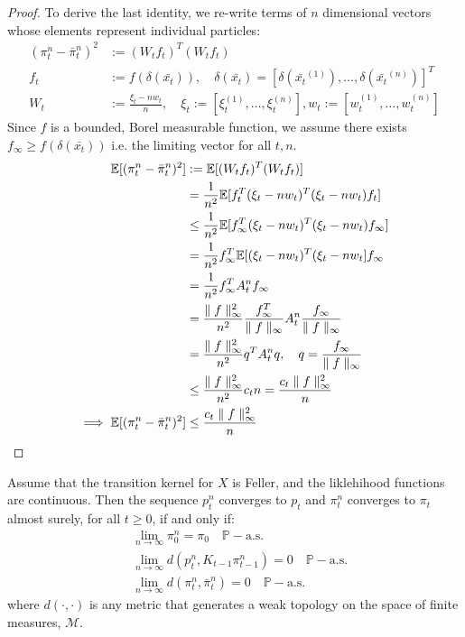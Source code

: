 \begin{lemma}
\begin{proof}
		To derive the last identity, we re-write terms of $n$ dimensional vectors whose elements represent individual particles:
		\begin{align}
		(\pi_t^n - \bar{\pi}_t^n)^2 &:= (W_t f_t)^T (W_t f_t) \\
		f_t& := f(\delta(\bar{x_t})), \quad \delta(\bar{x_t}) = [\delta(\bar{x_t}^{(1)}), \hdots, \delta(\bar{x_t}^{(n)})]^T \\		
		W_t& := \frac{\xi_t - nw_t}{n},  \quad \xi_t := [ \xi_t^{(1)}, \hdots, \xi_t^{(n)}], w_t := [w_t^{(1)}, \hdots, w_t^{(n)}]
		\end{align} Since $f$ is a bounded, Borel measurable function, we assume there exists $ f_\infty \geq f(\delta(\bar{x_t})) $ i.e. the limiting vector for all $t, n$. 
		\begin{align}
		\mathbb{E}[(\pi_t^n - \bar{\pi}_t^n)^2] &:= \mathbb{E}[(W_t f_t)^T (W_t f_t)] \\
		& = \frac{1}{n^2}\mathbb{E}[f_t^T (\xi_t - nw_t)^T(\xi_t - nw_t) f_t ] \\
		& \leq \frac{1}{n^2}\mathbb{E}[f_\infty^T (\xi_t - nw_t)^T(\xi_t - nw_t) f_\infty ] \\
		& = \frac{1}{n^2} f_\infty^T \mathbb{E}[ (\xi_t - nw_t)^T(\xi_t - nw_t ] f_\infty\\
		& = \frac{1}{n^2} f_\infty^T A_t^n f_\infty \\
		& = \frac{\parallel f\parallel_\infty^2}{n^2} \frac{f_\infty^T}{\parallel f\parallel_\infty} A_t^n \frac{f_\infty}{\parallel f\parallel_\infty} \\
		& = \frac{\parallel f\parallel_\infty^2}{n^2} q^T A_t^n q, \quad q = \frac{f_\infty}{\parallel f\parallel_\infty} \\
		& \leq \frac{\parallel f\parallel_\infty^2}{n^2} c_t n	
		= \frac{c_t \parallel f\parallel_\infty^2}{n} \\
		\implies \mathbb{E}[(\pi_t^n - \bar{\pi}_t^n)^2]  & \leq \frac{c_t \parallel f\parallel_\infty^2}{n}
		\end{align}
	\end{proof}
\end{lemma}

\begin{lemma} 
	Assume that the transition kernel for $X$ is Feller, and the liklehihood functions are continuous. Then the sequence $p^n_t$ converges to $p_t$ and $\pi^n_t$ converges to $\pi_t$ almost surely, for all $t \geq 0$, if and only if:
	\begin{align}
		& \lim_{n\to \infty} \pi_0^n = \pi_0 \quad \mathbb{P}-\mathrm{a.s.} \\
		& \lim_{n\to \infty} d(p^n_t, K_{t-1}\pi^n_{t-1})  = 0 \quad \mathbb{P}-\mathrm{a.s.} \\
		& \lim_{n\to \infty} d(\pi^n_t, \bar{\pi}^n_{t})  = 0 \quad \mathbb{P}-\mathrm{a.s.}
	\end{align} where $d(\cdot, \cdot)$ is any metric that generates a weak topology on the space of finite measures, $\mathcal{M}$. 
\end{lemma}

